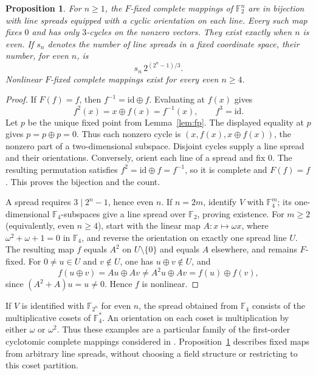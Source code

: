 \documentclass[11pt]{article}
\newtheorem{proposition}[theorem]{Proposition}
\begin{document}
\begin{proposition}\label{prop:F-spreads}
For $n\ge1$, the $F$-fixed complete mappings of $\mathbb F_2^n$ are in
bijection with line spreads equipped with a cyclic orientation on each line.
Every such map fixes $0$ and has only $3$-cycles on the nonzero vectors.
They exist exactly when $n$ is even. If $s_n$ denotes the number of line spreads
in a fixed coordinate space, their number, for even $n$, is
\[
s_n\,2^{(2^n-1)/3}.
\]
Nonlinear $F$-fixed complete mappings exist for every even $n\ge4$.
\end{proposition}
\begin{proof}
If $F(f)=f$, then $f^{-1}=\mathrm{id}\oplus f$. Evaluating at $f(x)$ gives
\[
f^2(x)=x\oplus f(x)=f^{-1}(x),\qquad f^3=\mathrm{id}.
\]
Let $p$ be the unique fixed point from Lemma~\ref{lem:fp}.
The displayed equality at $p$ gives $p=p\oplus p=0$.
Thus each nonzero cycle is $(x,f(x),x\oplus f(x))$, the nonzero part of
a two-dimensional subspace. Disjoint cycles supply a line spread and
their orientations. Conversely, orient each line of a spread and fix $0$.
The resulting permutation satisfies $f^2=\mathrm{id}\oplus f=f^{-1}$,
so it is complete and $F(f)=f$. This proves the bijection and the count.

A spread requires $3\mid2^n-1$, hence even $n$. If $n=2m$, identify
$V$ with $\mathbb F_4^m$; its one-dimensional $\mathbb F_4$-subspaces
give a line spread over $\mathbb F_2$, proving existence.
For $m\ge2$ (equivalently, even $n\ge4$), start with the linear map
$A:x\mapsto\omega x$, where
$\omega^2+\omega+1=0$ in $\mathbb F_4$, and reverse the orientation
on exactly one spread line $U$. The resulting map $f$ equals $A^2$ on
$U\setminus\{0\}$ and equals $A$ elsewhere, and remains $F$-fixed.
For $0\ne u\in U$ and $v\notin U$, one has $u\oplus v\notin U$, and
\[
f(u\oplus v)=Au\oplus Av\ne A^2u\oplus Av=f(u)\oplus f(v),
\]
since $(A^2+A)u=u\ne0$. Hence $f$ is nonlinear.
\end{proof}

If $V$ is identified with $\mathbb F_{2^n}$ for even $n$, the spread obtained
from $\mathbb F_4$ consists of the multiplicative cosets of $\mathbb F_4^*$.
An orientation on each coset is multiplication by either $\omega$ or $\omega^2$.
Thus these examples are a particular family of the first-order cyclotomic
complete mappings considered in \cite{BW21}. Proposition~\ref{prop:F-spreads}
describes fixed maps from arbitrary line spreads, without choosing a field
structure or restricting to this coset partition.
\end{document}
